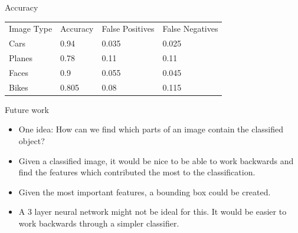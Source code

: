 \documentclass{beamer}
\begin{document}
\begin{frame}{Accuracy}
\begin{tabular}{| l | l | l | l |}
  \hline
  Image Type & Accuracy     & False Positives    & False Negatives \\
  Cars      & 0.94  & 0.035 & 0.025 \\
  Planes    & 0.78  & 0.11  & 0.11  \\
  Faces     & 0.9   & 0.055 & 0.045 \\
  Bikes     & 0.805 & 0.08  & 0.115 \\
  \hline
\end{tabular}
\end{frame}

\begin{frame}{Future work}
\begin{itemize}
  \item One idea: How can we find which parts of an image contain the classified object?
  \item Given a classified image, it would be nice to be able to work
    backwards and find the features which contributed the most to the
    classification.
  \item Given the most important features, a bounding box could be created.
  \item A 3 layer neural network might not be ideal for this. It would
    be easier to work backwards through a simpler classifier.
\end{itemize}

\end{frame}
\end{document}
